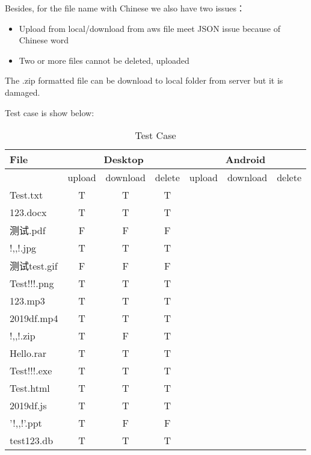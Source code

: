 Besides, for the file name with Chinese we also have two issues：\\
\begin{itemize}
\item{Upload from local/download from aws file meet JSON issue because of Chinese word}
\item{Two or more files cannot be deleted, uploaded}
\end{itemize}

The .zip formatted file can be download to local folder from server but it is damaged.



Test case is show below:\\
\begin{table}[H]
\caption{Test Case}
\centering
\begin{tabular}{|p{2.5cm}|c|c|c|c|c|c|}
\hline
File & \multicolumn{3}{|c|}{Desktop} &\multicolumn{3}{|c|}{Android} \\
\hline
& upload & download & delete & upload & download & delete \\
\hline
Test.txt & T & T & T\\
\hline
123.docx & T & T & T\\
\hline
测试.pdf& F & F & F\\
\hline
!,,!.jpg & T & T & T\\
\hline
测试test.gif& F & F & F\\
\hline
Test!!!.png & T & T & T\\
\hline
123.mp3& T & T & T\\
\hline
2019df.mp4 & T & T & T\\
\hline
!,,!.zip  & T & F & T\\
\hline
Hello.rar& T & T & T\\
\hline
Test!!!.exe& T & T & T\\
\hline
Test.html& T & T & T\\
\hline
2019df.js& T & T & T\\
\hline
'!,,!'.ppt & T & F & F\\
\hline
test123.db & T & T & T\\
\hline
\bottomrule
\end{tabular}
\end{table}


